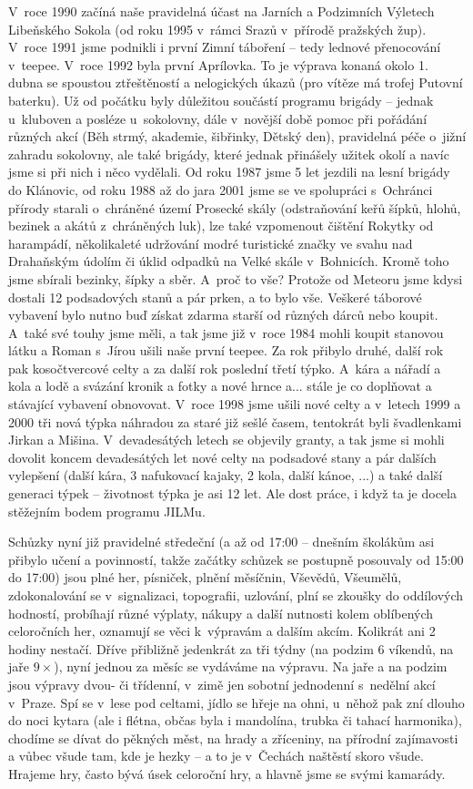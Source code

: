 \documentclass[a5paper, 11pt, twoside]{article}
\begin{document}
V~roce 1990 začíná naše pravidelná účast na Jarních a Podzimních
Výletech Libeňského Sokola (od roku 1995 v~rámci Srazů v~přírodě
pražských žup). V~roce 1991 jsme podnikli i první Zimní táboření -- tedy
lednové přenocování v~teepee. V~roce 1992 byla první Aprílovka. To je
výprava konaná okolo 1. dubna se spoustou ztřeštěností a nelogických
úkazů (pro vítěze má trofej Putovní baterku). Už od počátku byly
důležitou součástí programu brigády -- jednak u~kluboven a posléze
u~sokolovny, dále v~novější době pomoc při pořádání různých akcí (Běh
strmý, akademie, šibřinky, Dětský den), pravidelná péče o~jižní zahradu
sokolovny, ale také brigády, které jednak přinášely užitek okolí a navíc
jsme si při nich i něco vydělali. Od roku 1987 jsme 5 let jezdili na
lesní brigády do Klánovic, od roku 1988 až do jara 2001 jsme se ve
spolupráci s~Ochránci přírody starali o~chráněné území Prosecké skály
(odstraňování keřů šípků, hlohů, bezinek a akátů z~chráněných luk), lze
také vzpomenout čištění Rokytky od harampádí, několikaleté udržování
modré turistické značky ve svahu nad Drahaňským údolím či úklid odpadků
na Velké skále v~Bohnicích. Kromě toho jsme sbírali bezinky, šípky a
sběr. A~proč to vše? Protože od Meteoru jsme kdysi dostali 12
podsadových stanů a pár prken, a to bylo vše. Veškeré táborové vybavení
bylo nutno buď získat zdarma starší od různých dárců nebo koupit. A~také
své touhy jsme měli, a tak jsme již v~roce 1984 mohli koupit stanovou
látku a Roman s~Jírou ušili naše první teepee. Za rok přibylo druhé,
další rok pak kosočtvercové celty a za další rok poslední třetí týpko.
A~kára a nářadí a kola a lodě a svázání kronik a fotky a nové hrnce a...
stále je co doplňovat a stávající vybavení obnovovat. V~roce 1998 jsme
ušili nové celty a v~letech 1999 a 2000 tři nová týpka náhradou za staré
již sešlé časem, tentokrát byli švadlenkami Jirkan a Mišina.
V~devadesátých letech se objevily granty, a tak jsme si mohli dovolit
koncem devadesátých let nové celty na podsadové stany a pár dalších
vylepšení (další kára, 3 nafukovací kajaky, 2 kola, další kánoe, ...) a
také další generaci týpek -- životnost týpka je asi 12 let. Ale dost
práce, i když ta je docela stěžejním bodem programu JILMu.

Schůzky nyní již pravidelné středeční (a až od 17:00 -- dnešním školákům
asi přibylo učení a povinností, takže začátky schůzek se postupně
posouvaly od 15:00 do 17:00) jsou plné her, písniček, plnění měsíčnin,
Vševědů, Všeumělů, zdokonalování se v~signalizaci, topografii, uzlování,
plní se zkoušky do oddílových hodností, probíhají různé výplaty, nákupy
a další nutnosti kolem oblíbených celoročních her, oznamují se věci
k~výpravám a dalším akcím. Kolikrát ani 2 hodiny nestačí. Dříve přibližně
jedenkrát za tři týdny (na podzim 6 víkendů, na jaře \(9\times\)), nyní jednou za
měsíc se vydáváme na výpravu. Na jaře a na podzim jsou výpravy dvou- či
třídenní, v~zimě jen sobotní jednodenní s~nedělní akcí v~Praze. Spí se
v~lese pod celtami, jídlo se hřeje na ohni, u~něhož pak zní dlouho do noci
kytara (ale i flétna, občas byla i mandolína, trubka či tahací
harmonika), chodíme se dívat do pěkných měst, na hrady a zříceniny, na
přírodní zajímavosti a vůbec všude tam, kde je hezky -- a to je
v~Čechách naštěstí skoro všude. Hrajeme hry, často bývá úsek celoroční
hry, a hlavně jsme se svými kamarády.
\end{document}

